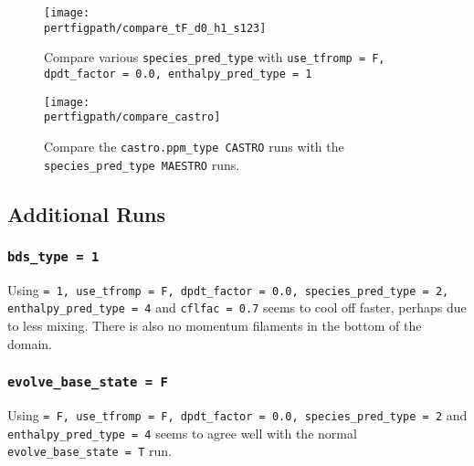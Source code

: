 \begin{figure}[!h]
\begin{minipage}[b]{0.5\linewidth}
\vspace{0pt}
\centering
\texttt{[image: \\pertfigpath/compare\_tF\_d0\_h1\_s123]}
\caption{Compare various {\tt species\_pred\_type} with {\tt use\_tfromp = F, 
dpdt\_factor = 0.0, enthalpy\_pred\_type = 1}}
\label{fig:compare_tF_d0_h1_s123}
\end{minipage}
\hspace{0.5cm}
\begin{minipage}[b]{0.5\linewidth}
\vspace{0pt}
\centering
\texttt{[image: \\pertfigpath/compare\_castro]}
\caption{Compare the {\tt castro.ppm\_type CASTRO} runs with the 
{\tt species\_pred\_type MAESTRO} runs.}
\label{fig:compare_castro}
\end{minipage}
\end{figure}


\subsection{Additional Runs}

\subsubsection{{\tt bds\_type = 1}}

Using  {\tt = 1, use\_tfromp = F, dpdt\_factor = 0.0, 
species\_pred\_type = 2, enthalpy\_pred\_type = 4} and 
{\tt cflfac = 0.7} seems to cool off faster, perhaps due to less mixing. 
There is also no momentum filaments in the bottom of the domain.

\subsubsection{{\tt evolve\_base\_state = F}}

Using  {\tt = F, use\_tfromp = F, dpdt\_factor = 0.0, 
species\_pred\_type = 2} and {\tt enthalpy\_pred\_type = 4} seems to agree 
well with the normal {\tt evolve\_base\_state = T} run.

